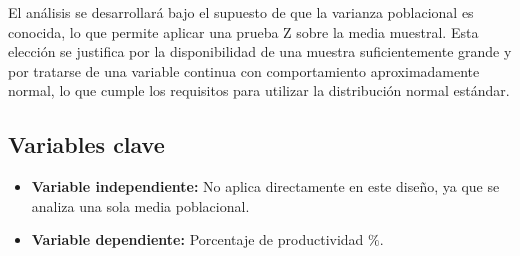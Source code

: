 El análisis se desarrollará bajo el supuesto de que la varianza poblacional es conocida, lo que permite aplicar una prueba Z sobre la media muestral. Esta elección se justifica por la disponibilidad de una muestra suficientemente grande y por tratarse de una variable continua con comportamiento aproximadamente normal, lo que cumple los requisitos para utilizar la distribución normal estándar.

\subsection*{Variables clave}

\begin{itemize}
\item \textbf{Variable independiente:} No aplica directamente en este diseño, ya que se analiza una sola media poblacional.
\item \textbf{Variable dependiente:} Porcentaje de productividad \(\%\).
\end{itemize}